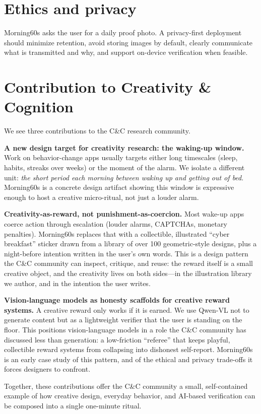\documentclass[manuscript,anonymous,review]{acmart}
\begin{document}
\section{Ethics and privacy}
Morning60s asks the user for a daily proof photo. A privacy-first deployment should minimize retention, avoid storing images by default, clearly communicate what is transmitted and why, and support on-device verification when feasible.

\section{Contribution to Creativity \& Cognition}
We see three contributions to the C\&C research community.

\textbf{A new design target for creativity research: the waking-up window.} Work on behavior-change apps usually targets either long timescales (sleep, habits, streaks over weeks) or the moment of the alarm. We isolate a different unit: \emph{the short period each morning between waking up and getting out of bed}. Morning60s is a concrete design artifact showing this window is expressive enough to host a creative micro-ritual, not just a louder alarm.

\textbf{Creativity-as-reward, not punishment-as-coercion.} Most wake-up apps coerce action through escalation (louder alarms, CAPTCHAs, monetary penalties). Morning60s replaces that with a collectible, illustrated ``cyber breakfast'' sticker drawn from a library of over 100 geometric-style designs, plus a night-before intention written in the user's own words. This is a design pattern the C\&C community can inspect, critique, and reuse: the reward itself is a small creative object, and the creativity lives on both sides---in the illustration library we author, and in the intention the user writes.

\textbf{Vision-language models as honesty scaffolds for creative reward systems.} A creative reward only works if it is earned. We use Qwen-VL not to generate content but as a lightweight verifier that the user is standing on the floor. This positions vision-language models in a role the C\&C community has discussed less than generation: a low-friction ``referee'' that keeps playful, collectible reward systems from collapsing into dishonest self-report. Morning60s is an early case study of this pattern, and of the ethical and privacy trade-offs it forces designers to confront.

Together, these contributions offer the C\&C community a small, self-contained example of how creative design, everyday behavior, and AI-based verification can be composed into a single one-minute ritual.
\end{document}
